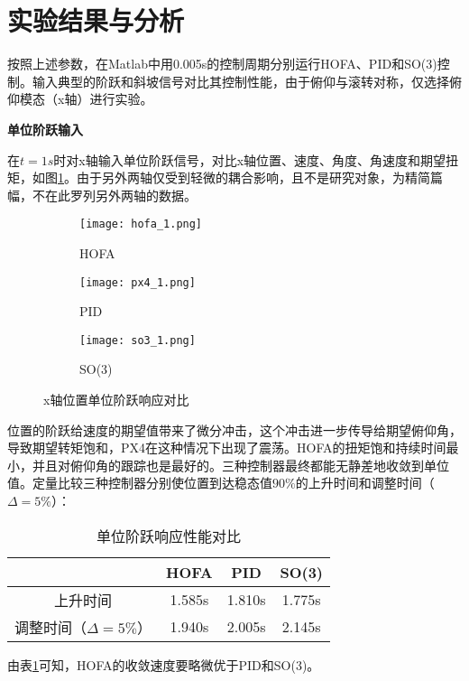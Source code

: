   \section{实验结果与分析}

  按照上述参数，在Matlab中用0.005s的控制周期分别运行HOFA、PID和SO(3)控制。输入典型的阶跃和斜坡信号对比其控制性能，由于俯仰与滚转对称，仅选择俯仰模态（x轴）进行实验。

  \textbf{单位阶跃输入}

  在$t=1s$时对x轴输入单位阶跃信号，对比x轴位置、速度、角度、角速度和期望扭矩，如图\ref{matlab_阶跃}。由于另外两轴仅受到轻微的耦合影响，且不是研究对象，为精简篇幅，不在此罗列另外两轴的数据。

\begin{figure}[h]
  \centering
  \begin{subfigure}[t]{0.33\textwidth}
    \centering
    \texttt{[image: hofa\_1.png]}
    \caption{HOFA}
  \end{subfigure}\hfill
  \begin{subfigure}[t]{0.33\textwidth}
    \centering
    \texttt{[image: px4\_1.png]}
    \caption{PID}
  \end{subfigure}\hfill
  \begin{subfigure}[t]{0.33\textwidth}
    \centering
    \texttt{[image: so3\_1.png]}
    \caption{SO(3)}
  \end{subfigure}
  \caption{x轴位置单位阶跃响应对比}
  \label{matlab_阶跃}
\end{figure}

位置的阶跃给速度的期望值带来了微分冲击，这个冲击进一步传导给期望俯仰角，导致期望转矩饱和，PX4在这种情况下出现了震荡。HOFA的扭矩饱和持续时间最小，并且对俯仰角的跟踪也是最好的。三种控制器最终都能无静差地收敛到单位值。定量比较三种控制器分别使位置到达稳态值$90\%$的上升时间和调整时间（$\Delta = 5\%$）：


\begin{table}[h]
  \centering
  \caption{单位阶跃响应性能对比}
  \begin{tabular}{cccc}
      \toprule
      & HOFA & PID & SO(3) \\
      \midrule
    上升时间 & 1.585s & 1.810s & 1.775s\\
    调整时间（$\Delta = 5\%$） & 1.940s & 2.005s &2.145s \\
      \bottomrule
  \end{tabular}

  \label{matlab阶跃对比}
\end{table}
由表\ref{matlab阶跃对比}可知，HOFA的收敛速度要略微优于PID和SO(3)。

